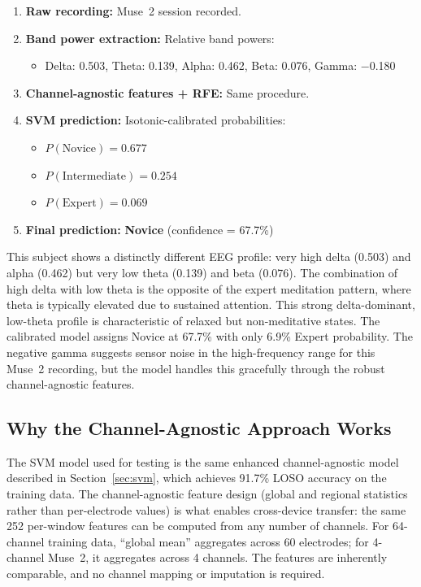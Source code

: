 \documentclass[12pt,a4paper]{article}
\begin{document}
\begin{enumerate}
  \item \textbf{Raw recording:} Muse~2 session recorded.
  \item \textbf{Band power extraction:} Relative band powers:
  \begin{itemize}
    \item Delta: 0.503, Theta: 0.139, Alpha: 0.462, Beta: 0.076, Gamma: $-$0.180
  \end{itemize}
  \item \textbf{Channel-agnostic features + RFE:} Same procedure.
  \item \textbf{SVM prediction:} Isotonic-calibrated probabilities:
  \begin{itemize}
    \item $P(\text{Novice}) = 0.677$
    \item $P(\text{Intermediate}) = 0.254$
    \item $P(\text{Expert}) = 0.069$
  \end{itemize}
  \item \textbf{Final prediction:} \textbf{Novice} (confidence = 67.7\%)
\end{enumerate}

This subject shows a distinctly different EEG profile: very high delta (0.503) and alpha (0.462) but very low theta (0.139) and beta (0.076). The combination of high delta with low theta is the opposite of the expert meditation pattern, where theta is typically elevated due to sustained attention. This strong delta-dominant, low-theta profile is characteristic of relaxed but non-meditative states. The calibrated model assigns Novice at 67.7\% with only 6.9\% Expert probability. The negative gamma suggests sensor noise in the high-frequency range for this Muse~2 recording, but the model handles this gracefully through the robust channel-agnostic features.

\subsection{Why the Channel-Agnostic Approach Works}

The SVM model used for testing is the same enhanced channel-agnostic model described in Section~\ref{sec:svm}, which achieves 91.7\% LOSO accuracy on the training data. The channel-agnostic feature design (global and regional statistics rather than per-electrode values) is what enables cross-device transfer: the same 252 per-window features can be computed from any number of channels. For 64-channel training data, ``global mean'' aggregates across 60 electrodes; for 4-channel Muse~2, it aggregates across 4 channels. The features are inherently comparable, and no channel mapping or imputation is required.
\end{document}

